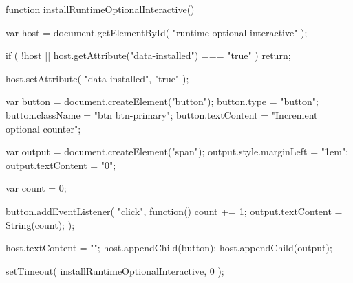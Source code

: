 \documentclass{ximera}
\begin{document}
\begin{javascript}
function installRuntimeOptionalInteractive() {
  var host = document.getElementById(
    "runtime-optional-interactive"
  );

  if (
    !host ||
    host.getAttribute("data-installed") === "true"
  ) {
    return;
  }

  host.setAttribute(
    "data-installed",
    "true"
  );

  var button = document.createElement("button");
  button.type = "button";
  button.className = "btn btn-primary";
  button.textContent = "Increment optional counter";

  var output = document.createElement("span");
  output.style.marginLeft = "1em";
  output.textContent = "0";

  var count = 0;

  button.addEventListener(
    "click",
    function() {
      count += 1;
      output.textContent = String(count);
    }
  );

  host.textContent = "";
  host.appendChild(button);
  host.appendChild(output);
}

setTimeout(
  installRuntimeOptionalInteractive,
  0
);
\end{javascript}

\end{document}
